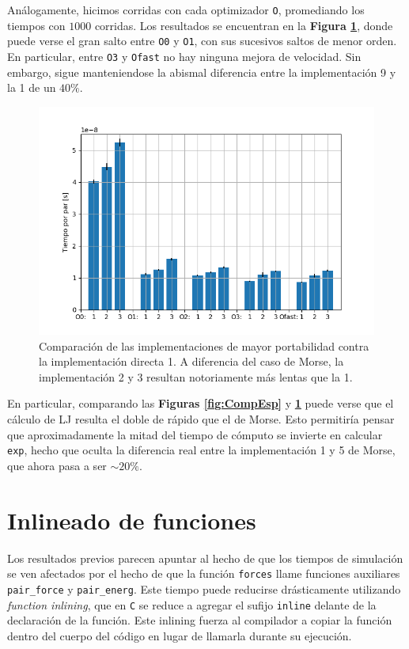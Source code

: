 \documentclass[twoside, 12pt]{article}
\begin{document}
An\'alogamente, hicimos corridas con cada optimizador \texttt{O}, promediando los tiempos con $1000$ corridas. Los resultados se encuentran en la \textbf{Figura \ref{fig:CompEsp_LJ}}, donde puede verse el gran salto entre \texttt{O0} y \texttt{O1}, con sus sucesivos saltos de menor orden. En particular, entre \texttt{O3} y \texttt{Ofast} no hay ninguna mejora de velocidad. Sin embargo, sigue manteniendose la abismal diferencia entre la implementaci\'on 9 y la 1 de un $40\%$.

\begin{figure}[h]
	\centering
	\includegraphics[trim = 10mm 5mm 10mm 5mm, clip, width=0.6\columnwidth]{Comp_tiempos_LJ.png}
	\caption{Comparaci\'on de las implementaciones de mayor portabilidad contra la implementaci\'on directa 1. A diferencia del caso de Morse, la implementaci\'on 2 y 3 resultan notoriamente m\'as lentas que la 1.}
	\label{fig:CompEsp_LJ}
\end{figure}

En particular, comparando las \textbf{Figuras \ref{fig:CompEsp}} y \textbf{\ref{fig:CompEsp_LJ}} puede verse que el c\'alculo de LJ resulta el doble de r\'apido que el de Morse. Esto permitir\'ia pensar que aproximadamente la mitad del tiempo de c\'omputo se invierte en calcular \texttt{exp}, hecho que oculta la diferencia real entre la implementaci\'on 1 y 5 de Morse, que ahora pasa a ser $\sim 20\%$. 

\section{Inlineado de funciones}

Los resultados previos parecen apuntar al hecho de que los tiempos de simulaci\'on se ven afectados por el hecho de que la funci\'on \texttt{forces} llame funciones auxiliares \texttt{pair\_force} y \texttt{pair\_energ}. Este tiempo puede reducirse dr\'asticamente utilizando \textit{function inlining}, que en \texttt{C} se reduce a agregar el sufijo \texttt{inline} delante de la declaraci\'on de la funci\'on. Este inlining fuerza al compilador a copiar la funci\'on dentro del cuerpo del c\'odigo en lugar de llamarla durante su ejecución. 
\end{document}
